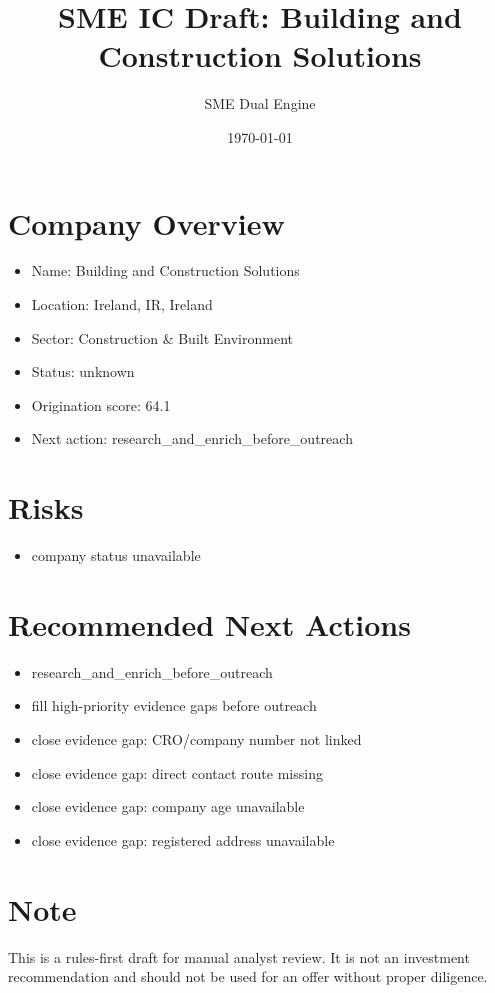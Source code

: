 \documentclass[11pt,a4paper]{article}
\title{SME IC Draft: Building and Construction Solutions}
\author{SME Dual Engine}
\date{\today}
\begin{document}
\maketitle
\section*{Company Overview}
\begin{itemize}[leftmargin=1.4em]
\item Name: Building and Construction Solutions
\item Location: Ireland, IR, Ireland
\item Sector: Construction \& Built Environment
\item Status: unknown
\item Origination score: 64.1
\item Next action: research\_and\_enrich\_before\_outreach
\end{itemize}
\section*{Risks}
\begin{itemize}[leftmargin=1.4em]
\item company status unavailable
\end{itemize}
\section*{Recommended Next Actions}
\begin{itemize}[leftmargin=1.4em]
\item research\_and\_enrich\_before\_outreach
\item fill high-priority evidence gaps before outreach
\item close evidence gap: CRO/company number not linked
\item close evidence gap: direct contact route missing
\item close evidence gap: company age unavailable
\item close evidence gap: registered address unavailable
\end{itemize}
\section*{Note}
This is a rules-first draft for manual analyst review. It is not an investment
recommendation and should not be used for an offer without proper diligence.
\end{document}
